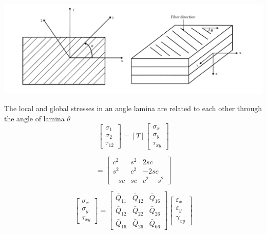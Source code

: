 \documentclass[smallextended]{svjour3}       %
\begin{document}
\begin{center}
  \includegraphics[width=\linewidth]{A_laminate_design_images/lamina_local_global_axes.png}
  \label{fig:lamina}
\end{center}

The local and global stresses in an angle lamina are related to each other through the angle of
lamina $\theta$
\begin{equation}
	\left[\begin{array}{l}\sigma_{1} \\ \sigma_{2} \\ \tau_{12
			}\end{array}\right]=[T]\left[\begin{array}{l}\sigma_{x} \\ \sigma_{y} \\
	\tau_{xy}\end{array}\right]
\end{equation}

\begin{equation}
	[T]=\left[\begin{array}{ccc}c^{2} & s^{2} & 2 s c \\ s^{2} & c^{2} & -2 s c \\ -s c & s c &
	c^{2}-s^{2}\end{array}\right]
\end{equation}

\begin{equation}
	\left[\begin{array}{l}\sigma_{x} \\ \sigma_{y} \\ \tau_{x
			y}\end{array}\right]=\left[\begin{array}{lll}\bar{Q}_{11} & \bar{Q}_{12} & \bar{Q}_{16}
			\\ \bar{Q}_{12} & \bar{Q}_{22} & \bar{Q}_{26} \\ \bar{Q}_{16} & \bar{Q}_{26} &
			\bar{Q}_{66}\end{array}\right]\left[\begin{array}{l}\varepsilon_{x} \\ \varepsilon_{y}
	\\ \gamma_{x y}\end{array}\right]
\end{equation}
\end{document}
